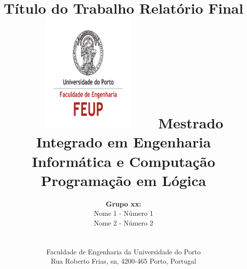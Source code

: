 \documentclass[15pt,a4paper]{article}
\begin{document}
\setlength{\textwidth}{16cm}
\setlength{\textheight}{22cm}

\title{\Huge\textbf{Título do Trabalho}\linebreak\linebreak\linebreak
\Large\textbf{Relatório Final}\linebreak\linebreak
\includegraphics[height=6cm, width=7cm]{feup.pdf}\linebreak \linebreak
\Large{Mestrado Integrado em Engenharia Informática e Computação} \linebreak \linebreak
\Large{Programação em Lógica}\linebreak
}

\author{\textbf{Grupo xx:}\\ Nome 1 - Número 1 \\ Nome 2 - Número 2 \\\linebreak\linebreak \\
 \\ Faculdade de Engenharia da Universidade do Porto \\ Rua Roberto Frias, s\/n, 4200-465 Porto, Portugal \linebreak\linebreak\linebreak
\linebreak\linebreak\vspace{1cm}}
\maketitle
\thispagestyle{empty}

\end{document}
